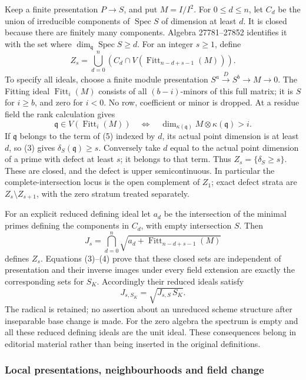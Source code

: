 Keep a finite presentation \(P\to S\), and put \(M=I/I^2\). For \(0\leq d\leq n\), let \(C_d\) be the union of irreducible components of \(\operatorname{Spec}S\) of dimension at least \(d\). It is closed because there are finitely many components. Algebra 27781--27852 identifies it with the set where \(\dim_{\mathfrak q}\operatorname{Spec}S\geq d\). For an integer \(s\geq1\), define \[
Z_s=\bigcup_{d=0}^{n}
\left(C_d\cap V(\operatorname{Fitt}_{n-d+s-1}(M))\right).\tag{5}
\] To specify all ideals, choose a finite module presentation \(S^a\xrightarrow D S^b\to M\to0\). The Fitting ideal \(\operatorname{Fitt}_i(M)\) consists of all \((b-i)\)-minors of this full matrix; it is \(S\) for \(i\geq b\), and zero for \(i<0\). No row, coefficient or minor is dropped. At a residue field the rank calculation gives \[
\mathfrak q\in V(\operatorname{Fitt}_i(M))
\quad\Longleftrightarrow\quad
\dim_{\kappa(\mathfrak q)}M\otimes\kappa(\mathfrak q)>i.
\] If \(\mathfrak q\) belongs to the term of (5) indexed by \(d\), its actual point dimension is at least \(d\), so (3) gives \(\delta_S(\mathfrak q)\geq s\). Conversely take \(d\) equal to the actual point dimension of a prime with defect at least \(s\); it belongs to that term. Thus \(Z_s=\{\delta_S\geq s\}\). These are closed, and the defect is upper semicontinuous. In particular the complete-intersection locus is the open complement of \(Z_1\); exact defect strata are \(Z_s\setminus Z_{s+1}\), with the zero stratum treated separately.

For an explicit reduced defining ideal let \(a_d\) be the intersection of the minimal primes defining the components in \(C_d\), with empty intersection \(S\). Then \[
J_s=\bigcap_{d=0}^{n}\sqrt{a_d+\operatorname{Fitt}_{n-d+s-1}(M)}
\] defines \(Z_s\). Equations (3)--(4) prove that these closed sets are independent of presentation and their inverse images under every field extension are exactly the corresponding sets for \(S_K\). Accordingly their reduced ideals satisfy \[
J_{s,S_K}=\sqrt{J_{s,S}\,S_K}.
\] The radical is retained; no assertion about an unreduced scheme structure after inseparable base change is made. For the zero algebra the spectrum is empty and all these reduced defining ideals are the unit ideal. These consequences belong in editorial material rather than being inserted in the original definitions.

\subsubsection{Local presentations, neighbourhoods and field change}\label{local-presentations-neighbourhoods-and-field-change}

